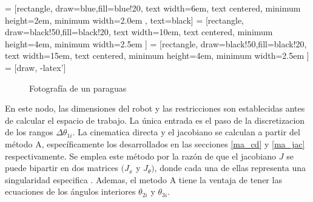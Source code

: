     
         = [rectangle, draw=blue,fill=blue!20, text width=6em, text centered, minimum height=2em, minimum width=2.0em , text=black]
         = [rectangle, draw=black!50,fill=black!20, text width=10em, text centered, minimum height=4em, minimum width=2.5em ]
         = [rectangle, draw=black!50,fill=black!20, text width=15em, text centered, minimum height=4em, minimum width=2.5em ]
         = [draw, -latex']
         \begin{center}
         \begin{figure}[htb]
                \caption{Fotografía de un paraguas}
                \label{f:Cap6_ws_1}
         \end{figure}
         \end{center}
         
        \vspace{-1cm}         
    
    En este nodo, las dimensiones del robot y las restricciones son establecidas antes de calcular el espacio de trabajo. La única entrada es el paso de la discretizacion de los rangos \(  \Delta  \theta _{1i} \). La cinematica directa y el jacobiano se calculan a partir del método A, específicamente los desarrollados en las secciones \ref{ma_cd} y \ref{ma_jac} respectivamente. Se emplea este método por la razón de que el jacobiano $J$ se puede bipartir en dos matrices $(J_{x}$  y  $J_{ \theta })$, donde cada una de ellas representa una singularidad especifica . Ademas, el metodo A tiene la ventaja de tener las ecuaciones de los ángulos interiores $\theta_{2i}$ y $\theta_{3i}$.
    
